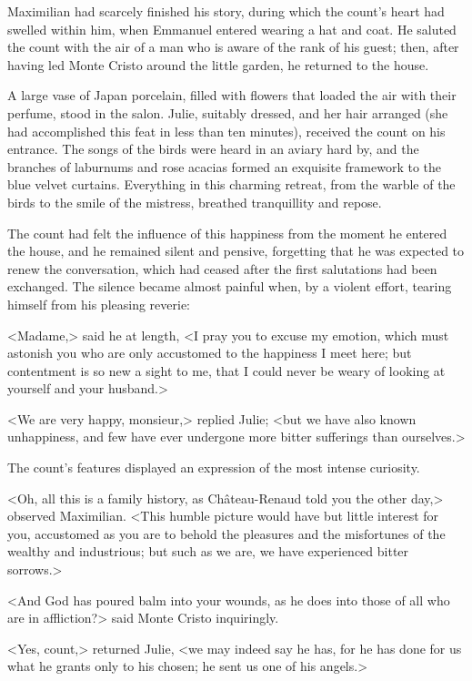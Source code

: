  Maximilian had scarcely finished his story, during which the count's heart had swelled within him, when Emmanuel entered wearing a hat and coat. He saluted the count with the air of a man who is aware of the rank of his guest; then, after having led Monte Cristo around the little garden, he returned to the house. 

 A large vase of Japan porcelain, filled with flowers that loaded the air with their perfume, stood in the salon. Julie, suitably dressed, and her hair arranged (she had accomplished this feat in less than ten minutes), received the count on his entrance. The songs of the birds were heard in an aviary hard by, and the branches of laburnums and rose acacias formed an exquisite framework to the blue velvet curtains. Everything in this charming retreat, from the warble of the birds to the smile of the mistress, breathed tranquillity and repose. 

 The count had felt the influence of this happiness from the moment he entered the house, and he remained silent and pensive, forgetting that he was expected to renew the conversation, which had ceased after the first salutations had been exchanged. The silence became almost painful when, by a violent effort, tearing himself from his pleasing reverie: 

 <Madame,> said he at length, <I pray you to excuse my emotion, which must astonish you who are only accustomed to the happiness I meet here; but contentment is so new a sight to me, that I could never be weary of looking at yourself and your husband.> 

 <We are very happy, monsieur,> replied Julie; <but we have also known unhappiness, and few have ever undergone more bitter sufferings than ourselves.> 

 The count's features displayed an expression of the most intense curiosity. 

 <Oh, all this is a family history, as Château-Renaud told you the other day,> observed Maximilian. <This humble picture would have but little interest for you, accustomed as you are to behold the pleasures and the misfortunes of the wealthy and industrious; but such as we are, we have experienced bitter sorrows.> 

 <And God has poured balm into your wounds, as he does into those of all who are in affliction?> said Monte Cristo inquiringly. 

 <Yes, count,> returned Julie, <we may indeed say he has, for he has done for us what he grants only to his chosen; he sent us one of his angels.> 

